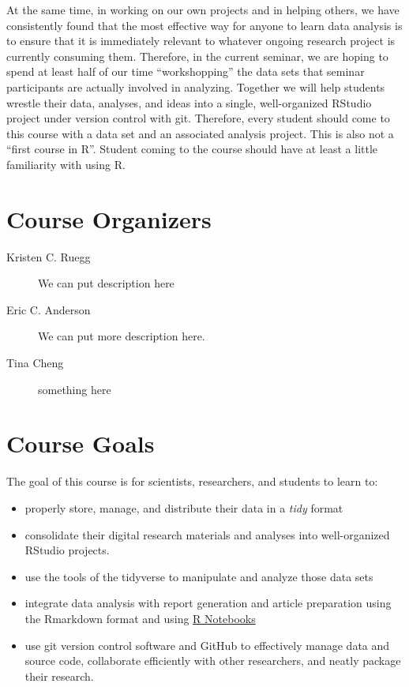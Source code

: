 \documentclass[]{book}
\providecommand{\tightlist}{%
  \setlength{\itemsep}{0pt}\setlength{\parskip}{0pt}}
\theoremstyle{definition}
\theoremstyle{definition}
\theoremstyle{remark}
\begin{document}
At the same time, in working on our own projects and in helping others,
we have consistently found that the most effective way for anyone to
learn data analysis is to ensure that it is immediately relevant to
whatever ongoing research project is currently consuming them.
Therefore, in the current seminar, we are hoping to spend at least half
of our time ``workshopping'' the data sets that seminar participants are
actually involved in analyzing. Together we will help students wrestle
their data, analyses, and ideas into a single, well-organized RStudio
project under version control with git. Therefore, every student should
come to this course with a data set and an associated analysis project.
This is also not a ``first course in R''. Student coming to the course
should have at least a little familiarity with using R.

\section{Course Organizers}\label{course-organizers}

\begin{description}
\item[Kristen C. Ruegg]
We can put description here
\item[Eric C. Anderson]
We can put more description here.
\item[Tina Cheng]
something here
\end{description}

\section{Course Goals}\label{course-goals}

The goal of this course is for scientists, researchers, and students to
learn to:

\begin{itemize}
\tightlist
\item
  properly store, manage, and distribute their data in a \emph{tidy}
  format
\item
  consolidate their digital research materials and analyses into
  well-organized RStudio projects.
\item
  use the tools of the tidyverse to manipulate and analyze those data
  sets
\item
  integrate data analysis with report generation and article preparation
  using the Rmarkdown format and using
  \href{http://rmarkdown.rstudio.com/r_notebooks.html}{R Notebooks}
\item
  use git version control software and GitHub to effectively manage data
  and source code, collaborate efficiently with other researchers, and
  neatly package their research.
\end{itemize}
\end{document}
